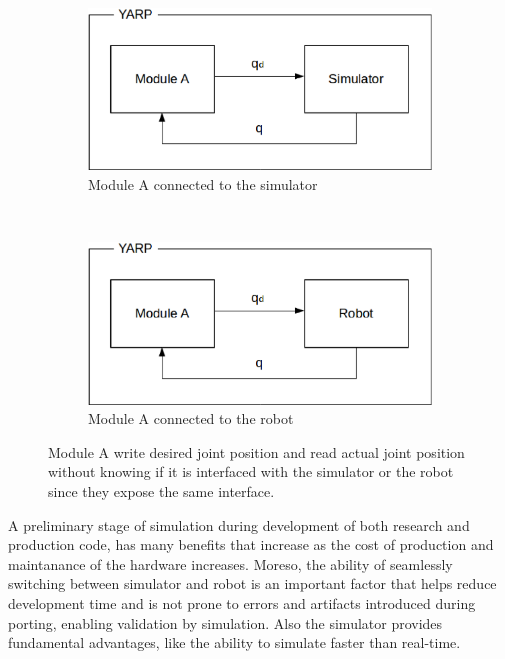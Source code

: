 \begin{figure}
        \centering
        \begin{subfigure}[b]{0.45\textwidth}
                \includegraphics[width=\textwidth]{images/yarp_simulation_a.eps}
                \caption{Module A connected to the simulator}
                \label{yarp_simulation_a}
        \end{subfigure}%
        \\
        \begin{subfigure}[b]{0.45\textwidth}
                \includegraphics[width=\textwidth]{images/yarp_simulation_b.eps}
                \caption{Module A connected to the robot}
                \label{yarp_simulation_b}
        \end{subfigure}
        \caption{Module A write desired joint position and read actual joint position without knowing if it is interfaced with the simulator or the robot since they expose the same interface.}\label{yarp_simulation}
\end{figure}

A preliminary stage of simulation during development of both research and production code, has many benefits that increase as the cost of production and maintanance of the hardware increases. Moreso, the ability of seamlessly switching between simulator and robot is an important factor that helps reduce development time and is not prone to errors and artifacts introduced during porting, enabling validation by simulation.
Also the simulator provides fundamental advantages, like the ability to simulate faster than real-time.

